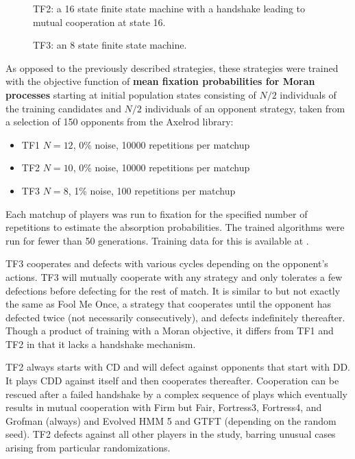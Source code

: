\documentclass{article}
\begin{document}
\begin{figure}[!hbtp]
    \centering
    
    \caption{TF2: a 16 state finite state machine with a handshake leading to
    mutual cooperation at state 16.}
    \label{fig:tf2}
\end{figure}


\begin{figure}[!hbtp]
    \centering
    
    \caption{TF3: an 8 state finite state machine.}
    \label{fig:tf3}
\end{figure}

As opposed to the previously described strategies, these strategies were trained
with the objective function of \textbf{mean fixation probabilities for Moran
processes} starting at initial population states consisting of \(N/2\)
individuals of the training candidates and \(N/2\) individuals of an opponent
strategy, taken from a selection of 150 opponents from the Axelrod library:

\begin{itemize}
	\item TF1 \(N=12\), 0\% noise, 10000 repetitions per matchup
	\item TF2 \(N=10\), 0\% noise, 10000 repetitions per matchup
	\item TF3 \(N=8\), 1\% noise, 100 repetitions per matchup
\end{itemize}

Each matchup of players was run to fixation for the specified number of
repetitions to estimate the absorption probabilities. The trained algorithms
were run for fewer than 50 generations. Training data for this is available at
\cite{data}.

TF3 cooperates and defects with
various cycles depending on the opponent's actions. TF3 will mutually
cooperate with any strategy and only tolerates a few defections before
defecting for the rest of match. It is similar to but not exactly the same as
Fool Me Once, a strategy that cooperates until the opponent has defected twice
(not necessarily consecutively), and defects indefinitely thereafter. Though a
product of training with a Moran objective, it differs from TF1 and TF2
in that it lacks a handshake mechanism.

TF2 always starts with CD and will defect against opponents that start with
DD\@. It plays CDD against itself and then cooperates thereafter. Cooperation
can be rescued after a failed handshake by a complex sequence of plays
which eventually results in mutual cooperation with Firm but Fair, Fortress3,
Fortress4, and Grofman (always) and Evolved HMM 5 and GTFT (depending on the
random seed). TF2 defects against all other players in the study, barring
unusual cases arising from particular randomizations.
\end{document}
